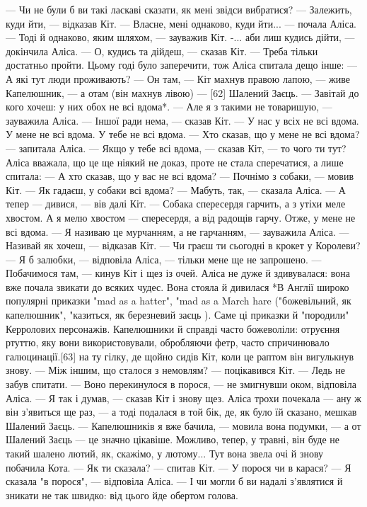 — Чи не були б ви такі ласкаві сказати, як мені звідси вибратися?
— Залежить, куди йти, — відказав Кіт.
— Власне, мені однаково, куди йти... — почала Аліса.
— Тоді й однаково, яким шляхом, — зауважив Кіт.
-... аби лиш кудись дійти, — докінчила Аліса.
— О, кудись та дійдеш, — сказав Кіт. — Треба тільки достатньо пройти.
Цьому годі було заперечити, тож Аліса спитала дещо інше:
— А які тут люди проживають?
— Он там, — Кіт махнув правою лапою, — живе Капелюшник, — а отам (він махнув лівою) — [62] Шалений Заєць. — Завітай до кого хочеш: у них обох не всі вдома*.
— Але я з такими не товаришую, — зауважила Аліса.
— Іншої ради нема, — сказав Кіт. — У нас у всіх не всі вдома. У мене не всі вдома. У тебе не всі вдома.
— Хто сказав, що у мене не всі вдома? — запитала Аліса.
— Якщо у тебе всі вдома, — сказав Кіт, — то чого ти тут?
Аліса вважала, що це ще ніякий не доказ, проте не стала сперечатися, а лише спитала:
— А хто сказав, що у вас не всі вдома?
— Почнімо з собаки, — мовив Кіт. — Як гадаєш, у собаки всі вдома?
— Мабуть, так, — сказала Аліса.
— А тепер — дивися, — вів далі Кіт. — Собака спересердя гарчить, а з утіхи меле хвостом. А я мелю хвостом — спересердя, а від радощів гарчу. Отже, у мене не всі вдома.
— Я називаю це мурчанням, а не гарчанням, — зауважила Аліса.
— Називай як хочеш, — відказав Кіт. — Чи граєш ти сьогодні в крокет у Королеви?
— Я б залюбки, — відповіла Аліса, — тільки мене ще не запрошено.
— Побачимося там, — кинув Кіт і щез із очей.
Аліса не дуже й здивувалася: вона вже почала звикати до всяких чудес. Вона стояла й дивилася
*В Англії широко популярні приказки "mad as a hatter", "mad as a March hare ("божевільний, як капелюшник", "казиться, як березневий заєць ). Саме ці приказки й "породили" Керролових персонажів. Капелюшники й справді часто божеволіли: отруєння ртуттю, яку вони використовували, обробляючи фетр, часто спричинювало галюцинації.[63]
на ту гілку, де щойно сидів Кіт, коли це раптом він вигулькнув знову.
— Між іншим, що сталося з немовлям? — поцікавився Кіт. — Ледь не забув спитати.
— Воно перекинулося в порося, — не змигнувши оком, відповіла Аліса.
— Я так і думав, — сказав Кіт і знову щез.
Аліса трохи почекала — ану ж він з'явиться ще раз, — а тоді подалася в той бік, де, як було їй сказано, мешкав Шалений Заєць.
— Капелюшників я вже бачила, — мовила вона подумки, — а от Шалений Заєць — це значно цікавіше. Можливо, тепер, у травні, він буде не такий шалено лютий, як, скажімо, у лютому...
Тут вона звела очі й знову побачила Кота.
— Як ти сказала? — спитав Кіт. — У порося чи в карася?
— Я сказала "в порося", — відповіла Аліса. — І чи могли б ви надалі з'являтися й зникати не так швидко: від цього йде обертом голова.

